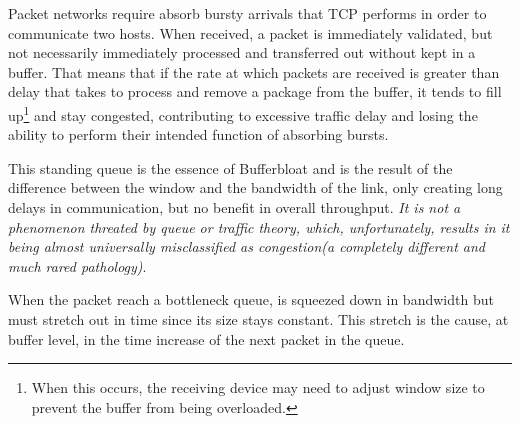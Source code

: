 Packet networks require absorb bursty arrivals that TCP performs in order to
communicate two hosts. When received, a packet is immediately validated, but
not necessarily immediately processed and transferred out without kept in a
buffer. That means that if the rate at which packets are received is greater
than delay that takes to process and remove a package from the buffer, it
tends to fill up\footnote{When this occurs, the receiving device may need to
adjust window size to prevent the buffer from being overloaded.} and stay
congested, contributing to excessive traffic delay and losing the ability to
perform their intended function of absorbing bursts.

This standing queue is the essence of Bufferbloat and is the result of the
difference between the window and the bandwidth of the link, only creating
long delays in communication, but no benefit in overall throughput. \textit{It
is not a phenomenon threated by queue or traffic theory, which, unfortunately,
results in it being almost universally misclassified as congestion(a
completely different and much rared pathology)}\cite{CACMStaff}.

When the packet reach a bottleneck queue, is squeezed down in bandwidth but
must stretch out in time since its size stays constant. This stretch is the
cause, at buffer level, in the time increase of the next packet in the queue.
